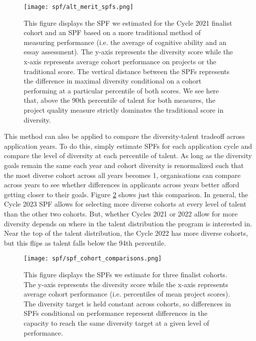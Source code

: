\begin{figure}[htbp]
    \centering
    \texttt{[image: spf/alt\_merit\_spfs.png]} 
    \caption{This figure displays the SPF we estimated for the Cycle 2021 finalist cohort and an SPF based on a more traditional method of measuring performance (i.e. the average of cognitive ability and an essay assessment). The y-axis represents the diversity score while the x-axis represents average cohort performance on projects or the traditional score. The vertical distance between the SPFs represents the difference in maximal diversity conditional on a cohort performing at a particular percentile of both scores. We see here that, above the 90th percentile of talent for both measures, the project quality measure strictly dominates the traditional score in diversity.}
    \label{fig:compare_div_tradeoffs}
\end{figure}
        
This method can also be applied to compare the diversity-talent tradeoff across application years. To do this, simply estimate SPFs for each application cycle and compare the level of diversity at each percentile of talent. As long as the diversity goals remain the same each year and cohort diversity is renormalized such that the most diverse cohort across all years becomes 1, organisations can compare across years to see whether differences in applicants across years better afford getting closer to their goals. Figure \ref{fig:diversity_across_cohorts} shows just this comparison. In general, the Cycle 2023 SPF allows for selecting more diverse cohorts at every level of talent than the other two cohorts. But, whether Cycles 2021 or 2022 allow for more diversity depends on where in the talent distribution the program is interested in. Near the top of the talent distribution, the Cycle 2022 has more diverse cohorts, but this flips as talent falls below the 94th percentile.

\begin{figure}[!htb]
    \centering
    \texttt{[image: spf/spf\_cohort\_comparisons.png]} 
    \caption{ This figure displays the SPFs we estimate for three finalist cohorts. The y-axis represents the diversity score while the x-axis represents average cohort performance (i.e. percentiles of mean project scores). The diversity target is held constant across cohorts, so differences in SPFs conditional on performance represent differences in the capacity to reach the same diversity target at a given level of performance.}
    \label{fig:diversity_across_cohorts}
\end{figure}

